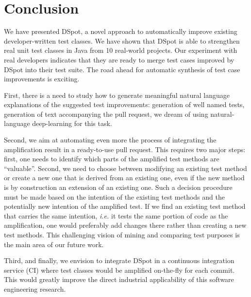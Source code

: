 \documentclass[table,xcdraw,smallextended]{svjour3}
\newcommand{\ie}{\textit{i.e.}\xspace}
\newcommand{\dspot}{DSpot\xspace}
\begin{document}
\section{Conclusion}
\label{sec:conclusion}

We have presented \dspot, a novel approach to automatically improve existing developer-written test classes.
We have shown that \dspot is able to strengthen real unit test classes in Java from 10 real-world projects. 
Our experiment with real developers indicates that they are ready to merge test cases improved by \dspot into their test suite. 
The road ahead for automatic synthesis of test case improvements is exciting.

First, there is a need to study how to generate meaningful natural language explanations of the suggested test improvements: generation of well named tests, generation of text accompanying the pull request, we dream of using natural-language deep-learning for this task.

Second, we aim at automating even more the process of integrating the amplification result in a ready-to-use pull request. This requires two major steps: first, one needs to identify which parts of the amplified test methods are ``valuable''. 
Second, we need to choose between modifying an existing test method or create a new one that is derived from an existing one, even if the new method is by construction an extension of an existing one. 
Such a decision procedure must be made based on the intention of the existing test methods and the potentially new intention of the amplified test. If we find an existing test method that carries the same intention, \ie it tests the same portion of code as the amplification, one would preferably add changes there rather than creating a new test methods. This challenging vision of mining and comparing test purposes is the main area of our future work.

Third, and finally, we envision to integrate \dspot in a continuous integration service (CI) where test classes would be amplified on-the-fly for each commit. This would greatly improve the direct industrial applicability of this software engineering research.


\balance


\end{document}
